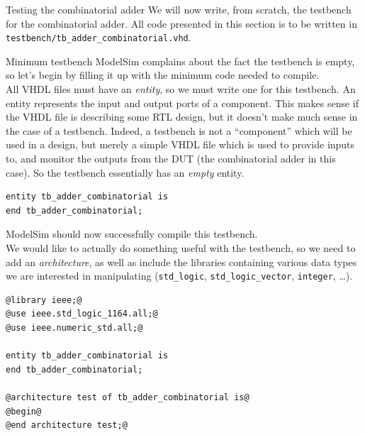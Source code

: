 \documentclass[lab]{course}
\begin{document}
\clearpage

\begin{section}{Testing the combinatorial adder}
    We will now write, from scratch, the testbench for the combinatorial adder. All code presented in this section is to be written in \verb+testbench/tb_adder_combinatorial.vhd+.

    \begin{subsection}{Minimum testbench}
        ModelSim complains about the fact the testbench is empty, so let's begin by filling it up with the minimum code needed to compile. \\

        All VHDL files must have an \emph{entity}, so we must write one for this testbench. An entity represents the input and output ports of a component. This makes sense if the VHDL file is describing some RTL design, but it doesn't make much sense in the case of a testbench. Indeed, a testbench is not a ``component'' which will be used in a design, but merely a simple VHDL file which is used to provide inputs to, and monitor the outputs from the DUT (the combinatorial adder in this case). So the testbench essentially has an \emph{empty} entity.

        \begin{lstlisting}[caption={Minimum testbench (only empty entity)}, label={lst:combinatorial_minimum_testbench}]
entity tb_adder_combinatorial is
end tb_adder_combinatorial;
        \end{lstlisting}
    \end{subsection}

    ModelSim should now successfully compile this testbench. \\

    We would like to actually do something useful with the testbench, so we need to add an \emph{architecture}, as well as include the libraries containing various data types we are interested in manipulating (\verb+std_logic+, \verb+std_logic_vector+, \verb+integer+, \ldots).

    \begin{lstlisting}[caption={Add libraries \& empty architecture}, label={lst:combinatorial_add_libraries_and_empty_architecture}]
@library ieee;@
@use ieee.std_logic_1164.all;@
@use ieee.numeric_std.all;@

entity tb_adder_combinatorial is
end tb_adder_combinatorial;

@architecture test of tb_adder_combinatorial is@
@begin@
@end architecture test;@
    \end{lstlisting}


\end{section}
\end{document}
